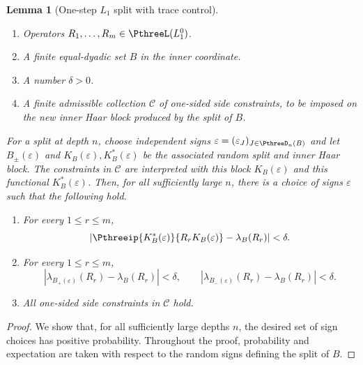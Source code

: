 \documentclass[11pt,reqno]{amsart}
\makeatletter
\theoremstyle{plain}
\newtheorem{lemma}[lemma]{Lemma}
\theoremstyle{definition}
\newcounter{problempaper}
\newenvironment{problempaperbody}{%
  \setcounter{subsection}{0}%
  \setcounter{subsubsection}{0}%
  \setcounter{paragraph}{0}%
  \renewcommand{\thesubsection}{\arabic{subsection}}%
  \renewcommand{\thesubsubsection}{\thesubsection.\arabic{subsubsection}}%
  \renewcommand{\theparagraph}{\thesubsubsection.\arabic{paragraph}}%
  \let\problem@outersection\section
  \let\problem@outersubsection\subsection
  \let\problem@outersubsubsection\subsubsection
  \let\problem@outerparagraph\paragraph
  \let\section\problem@papersection
  \let\subsection\problem@papersubsection
  \let\subsubsection\problem@papersubsubsection
}{%
  \let\section\problem@outersection
  \let\subsection\problem@outersubsection
  \let\subsubsection\problem@outersubsubsection
  \let\paragraph\problem@outerparagraph
}
\newcommand{\problem@target}[2]{%
  \hypertarget{problem-\theproblempaper-#1-#2}{}%
}
\newcommand{\problem@paperheading}[3]{%
  \par\bigskip
  \problem@target{#1}{#2}%
  \noindent{\large\bfseries #2.\quad #3\par}%
  \nobreak\smallskip
}
\newcommand{\problem@papersubheading}[3]{%
  \par\medskip
  \problem@target{#1}{#2}%
  \noindent{\normalsize\bfseries #2.\quad #3\par}%
  \nobreak\smallskip
}
\newcommand{\problem@papersubsubheading}[3]{%
  \par\smallskip
  \problem@target{#1}{#2}%
  \noindent{\normalsize\itshape #2.\quad #3.\ }%
}
\def\problem@papersection{%
  \@ifstar{\problem@papersectionstar}{\problem@papersectionnostar}%
}
\def\problem@papersectionstar#1{%
  \par\bigskip\noindent{\large\bfseries #1\par}\nobreak\smallskip
}
\def\problem@papersectionnostar#1{%
  \refstepcounter{subsection}%
  \setcounter{subsubsection}{0}%
  \setcounter{paragraph}{0}%
  \problem@paperheading{section}{\thesubsection}{#1}%
  \problem@writecontentsline{section}{\thesubsection}{#1}%
}
\def\problem@papersubsection{%
  \@ifstar{\problem@papersubsectionstar}{\problem@papersubsectionnostar}%
}
\def\problem@papersubsectionstar#1{%
  \par\medskip\noindent{\normalsize\bfseries #1\par}\nobreak\smallskip
}
\def\problem@papersubsectionnostar#1{%
  \refstepcounter{subsubsection}%
  \setcounter{paragraph}{0}%
  \problem@papersubheading{subsection}{\thesubsubsection}{#1}%
  \problem@writecontentsline{subsection}{\thesubsubsection}{#1}%
}
\def\problem@papersubsubsection{%
  \@ifstar{\problem@papersubsubsectionstar}{\problem@papersubsubsectionnostar}%
}
\def\problem@papersubsubsectionstar#1{%
  \par\smallskip\noindent{\normalsize\itshape #1.\ }%
}
\def\problem@papersubsubsectionnostar#1{%
  \refstepcounter{paragraph}%
  \problem@papersubsubheading{subsubsection}{\theparagraph}{#1}%
  \problem@writecontentsline{subsubsection}{\theparagraph}{#1}%
}
\newcommand{\problem@writecontentsline}[3]{%
  \begingroup
  \protected@write\@auxout{}{%
    \string\problemcontentsentry{\theproblempaper}{#1}{#2}{#3}{\thepage}%
  }%
  \endgroup
}
\newcommand{\problemcontentsentry}[5]{%
  \@ifundefined{problemcontents@#1}{%
    \expandafter\gdef\csname problemcontents@#1\endcsname{}%
  }{}%
  \expandafter\g@addto@macro\csname problemcontents@#1\endcsname{%
    \problemcontentsline{#1}{#2}{#3}{#4}{#5}%
  }%
}
\newcommand{\problemcontentslink}[4]{%
  \hyperlink{problem-#1-#2-#3}{#4}%
}
\newcommand{\problemcontentsline}[5]{%
  \ifstrequal{#2}{section}{%
    \par\noindent
    \problemcontentslink{#1}{#2}{#3}{\makebox[2.5em][l]{#3}#4}%
    \nobreak\dotfill
    \problemcontentslink{#1}{#2}{#3}{#5}\par
  }{%
    \ifstrequal{#2}{subsection}{%
      \par\noindent\hspace*{1.5em}%
      \problemcontentslink{#1}{#2}{#3}{\makebox[3.5em][l]{#3}#4}%
      \nobreak\dotfill
      \problemcontentslink{#1}{#2}{#3}{#5}\par
    }{%
      \par\noindent\hspace*{3em}%
      \problemcontentslink{#1}{#2}{#3}{\makebox[4.5em][l]{#3}#4}%
      \nobreak\dotfill
      \problemcontentslink{#1}{#2}{#3}{#5}\par
    }%
  }%
}
\makeatother
\begin{document}
\begin{problempaperbody}
\begin{lemma}[One-step $L_1$ split with trace control]
\begin{enumerate}[label=\textup{(\alph*)}]
\item \label{p3:item:l1-one-step-hyp-operators} Operators $R_1,\ldots,R_m\in\PthreeL(L_1^0)$.

\item \label{p3:item:l1-one-step-hyp-set} A finite equal-dyadic set $B$ in the inner coordinate.

\item \label{p3:item:l1-one-step-hyp-error} A number $\delta>0$.

\item \label{p3:item:l1-one-step-hyp-side} A finite admissible collection $\mathscr C$ of one-sided side constraints, to be imposed on the new inner Haar block produced by the split of $B$.
\end{enumerate}

For a split at depth $n$, choose independent signs $\varepsilon=(\varepsilon_J)_{J\in\PthreeD_n(B)}$ and let $B_\pm(\varepsilon)$ and $K_B(\varepsilon),K_B^*(\varepsilon)$ be the associated random split and inner Haar block. The constraints in $\mathscr C$ are interpreted with this block $K_B(\varepsilon)$ and this functional $K_B^*(\varepsilon)$. Then, for all sufficiently large $n$, there is a choice of signs $\varepsilon$ such that the following hold.

\begin{enumerate}[label=\textup{(\roman*)}]
\item \label{p3:item:l1-one-step-diagonal} For every $1\leq r\leq m$,
\begin{equation}
\label{p3:eq:l1-new-diagonal-trace}
        \left|\Pthreeip{K_B^*(\varepsilon)}{R_rK_B(\varepsilon)}-\lambda_B(R_r)\right|<\delta.
\end{equation}

\item \label{p3:item:l1-one-step-child-traces} For every $1\leq r\leq m$,
\begin{equation}
\label{p3:eq:l1-child-traces}
        |\lambda_{B_+(\varepsilon)}(R_r)-\lambda_B(R_r)|<\delta,\qquad |\lambda_{B_-(\varepsilon)}(R_r)-\lambda_B(R_r)|<\delta.
\end{equation}

\item \label{p3:item:l1-one-step-side} All one-sided side constraints in $\mathscr C$ hold.
\end{enumerate}
\end{lemma}

\begin{proof}
We show that, for all sufficiently large depths $n$, the desired set of sign choices has positive probability. Throughout the proof, probability and expectation are taken with respect to the random signs defining the split of $B$.


\end{proof}
\end{problempaperbody}
\end{document}
